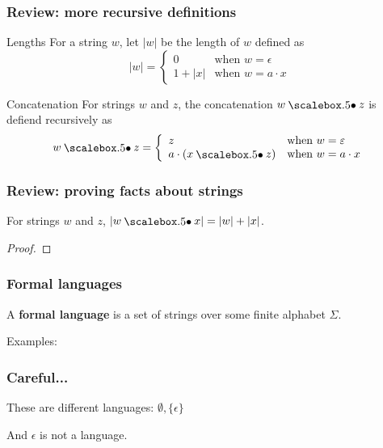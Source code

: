 \begin{frame}
  \frametitle{Review: more recursive definitions}

  \begin{block}{Lengths}
    For a string $w$, let $|w|$ be the length of $w$ defined as
    \[
    |w| = \left\{
    \begin{array}{ll}
      0 & \mbox{when $w=\epsilon$} \\
      1 + |x| & \mbox{when $w=a\cdot x$}
    \end{array}
    \right.
    \]
  \end{block}

  \begin{block}{Concatenation}
    For strings $w$ and $z$, the concatenation $w\sbullet z$ is defiend
    recursively as
    \[
    w\sbullet z = \left\{
    \begin{array}{ll}
      z                   & \mbox{when $w=\epsilon$} \\
      a\cdot(x\sbullet z)  & \mbox{when $w=a\cdot x$}
    \end{array}
    \right.
    \]
  \end{block} 
\end{frame}

\begin{frame}
  \frametitle{Review: proving facts about strings}

  \begin{lemma}
    For strings $w$ and $z$, $|w\sbullet x|=|w|+|x|$.
  \end{lemma}

  \begin{proof}
    \vspace{2in}
  \end{proof}
\end{frame}

\begin{frame}
  \frametitle{Formal languages}

  A {\color{red}\bf formal language} is a set of strings over some
  finite alphabet $\Sigma$.

  Examples:
  \vspace{2.5in}
\end{frame}

\begin{frame}
  \frametitle{Careful...}

  These are different languages: $\emptyset,\{\epsilon\}$

  And $\epsilon$ is not a language.

\end{frame}

